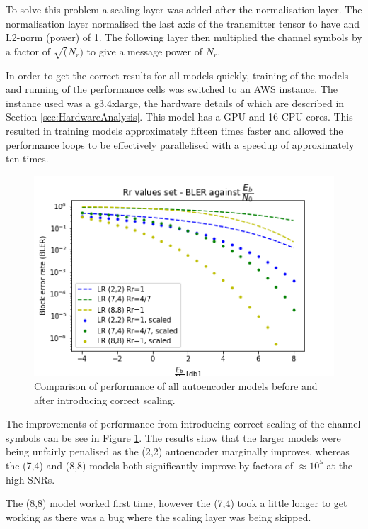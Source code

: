 \documentclass[12pt,onecolumn,letterpaper]{article}
\newcommand\genfigsize{0.5}
\begin{document}
To solve this problem a scaling layer was added after the normalisation layer. The normalisation layer normalised the last axis of the transmitter tensor to have and L2-norm (power) of 1. The following layer then multiplied the channel symbols by a factor of $\sqrt(N_r)$ to give a message power of $N_r$. 

In order to get the correct results for all models quickly, training of the models and running of the performance cells was switched to an AWS instance. The instance used was a g3.4xlarge, the hardware details of which are described in Section \ref{sec:HardwareAnalysis}. This model has a GPU and 16 CPU cores. This resulted in training models approximately fifteen times faster and allowed the performance loops to be effectively parallelised with a speedup of approximately ten times. 

\begin{figure}[t]
   \centering
   \includegraphics[width=\genfigsize\linewidth]{figures/autoencoders_correct_scaling_comparison.png}
   \caption{Comparison of performance of all autoencoder models before and after introducing correct scaling.}
   \label{fig:AutoencodersAllScalingComp}
\end{figure}

The improvements of performance from introducing correct scaling of the channel symbols can be see in Figure \ref{fig:AutoencodersAllScalingComp}. The results show that the larger models were being unfairly penalised as the (2,2) autoencoder marginally improves, whereas the (7,4) and (8,8) models both significantly improve by factors of $\approx 10^5$ at the high SNRs. 

The (8,8) model worked first time, however the (7,4) took a little longer to get working as there was a bug where the scaling layer was being skipped.
\end{document}
